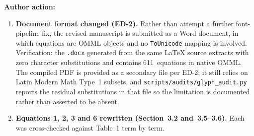 \documentclass[11pt,a4paper]{article}
\newcommand{\arhead}[1]{\medskip\noindent\textbf{#1}\par\smallskip}
\begin{document}
\arhead{Author action:}
\begin{enumerate}[leftmargin=1.4em,itemsep=0.3em]
\item \textbf{Document format changed (ED-2).}
      Rather than attempt a further font-pipeline fix, the revised
      manuscript is submitted as a Word document, in which equations are
      OMML objects and no \texttt{ToUnicode} mapping is involved.
      Verification: the \texttt{.docx} generated from the same \LaTeX{}
      source extracts with zero character substitutions and contains
      611~equations in native OMML\@. The compiled PDF is provided as a
      secondary file per ED-2; it still relies on Latin Modern Math
      Type~1 subsets, and
      \texttt{scripts/audits/glyph\_audit.py} reports the residual
      substitutions in that file so the limitation is documented rather
      than asserted to be absent.
\item \textbf{Equations 1, 2, 3 and 6 rewritten (Section~3.2 and~3.5--3.6).}
      Each was cross-checked against Table~1 term by term.


\end{enumerate}
\end{document}
